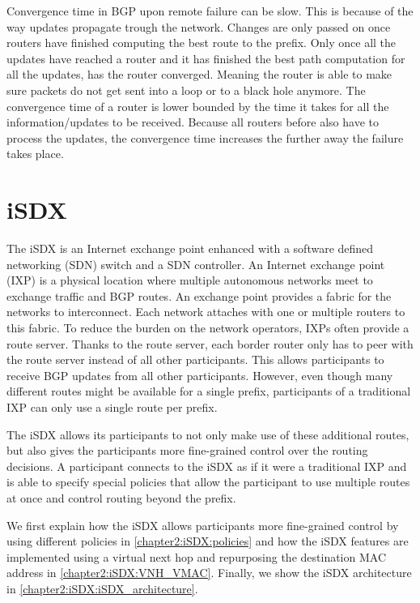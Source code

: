 Convergence time in BGP upon remote failure can be slow.
This is because of the way updates propagate trough the network. Changes are only passed on once routers have finished computing the best route to the prefix. Only once all the updates have reached a router and it has finished the best path computation for all the updates, has the router converged. Meaning the router is able to make sure packets do not get sent into a loop or to a black hole anymore. The convergence time of a router is lower bounded by the time it takes for all the information/updates to be received. Because all routers before also have to process  the updates, the convergence time increases the further away the failure takes place. 


\section{\label{chapter2:iSDX}iSDX}

The iSDX is an Internet exchange point enhanced with a software defined networking (SDN) switch and a SDN controller.
An Internet exchange point (IXP) is a physical location where multiple autonomous networks meet to exchange traffic and BGP routes. An exchange point provides a fabric for the networks to interconnect. Each network attaches with one or multiple routers to this fabric. To reduce the burden on the network operators, IXPs often provide a route server. Thanks to the route server, each border router only has to peer with the route server instead of all other participants. This allows participants to receive BGP updates from all other participants. However, even though many different routes might be available for a single prefix, participants of a traditional IXP can only use a single route per prefix.

The iSDX allows its participants to not only make use of these additional routes, but also gives the participants  more fine-grained control over the routing decisions. A participant connects to the iSDX as if it were a traditional IXP and is able to specify special policies that allow the participant to use multiple routes at once and control routing beyond the prefix.

We first explain how the iSDX allows participants more fine-grained control by using different policies in \ref{chapter2:iSDX:policies} and how the iSDX features are implemented using a virtual next hop and repurposing the destination MAC address in \ref{chapter2:iSDX:VNH_VMAC}. Finally, we show the iSDX architecture in \ref{chapter2:iSDX:iSDX_architecture}.

